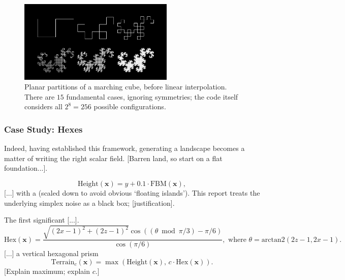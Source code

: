 \documentclass[a4paper, 11pt]{article}
\begin{document}
\begin{flushleft}
\vspace{10pt}\noindent
\begin{figure}[h]
\centering
\includegraphics[width=0.66\textwidth]{Dragon Curves}
\caption{Planar partitions of a marching cube, before linear interpolation. There are $15$ fundamental cases, ignoring symmetries; the code itself considers all $2^8 = 256$ possible configurations.}
\label{Interpolated Marching Squares}
\end{figure}

\newpage
\subsubsection{Case Study: Hexes}

Indeed, having established this framework, generating a landscape becomes a matter of writing the right scalar field. [Barren land, so start on a flat foundation...]. %

$$\textrm{Height}(\mathbf{x}) = y + 0.1\cdot\textrm{FBM}(\mathbf{x}),$$
[...] with a (scaled down to avoid obvious `floating islands'). This report treats the underlying simplex noise as a black box; [justification].

\vspace{5pt}\noindent
The first significant [...].
$$\textrm{Hex}(\mathbf{x}) = \frac{\sqrt{(2x-1)^2+(2z-1)^2}\cos\left((\theta\bmod\pi/3)-\pi/6\right)}{\cos\left(\pi/6\right)}, \,\, \textrm{where} \,\, \theta = \textrm{arctan2}\left(2z-1, 2x-1\right).$$
[...] a vertical hexagonal prism
$$\textrm{Terrain}_c(\mathbf{x}) = \max\left(\textrm{Height}(\mathbf{x}), \, c\cdot\textrm{Hex}(\mathbf{x})\right).$$
[Explain maximum; explain $c$.]%

\vspace{5pt} 


\end{flushleft}
\end{document}
